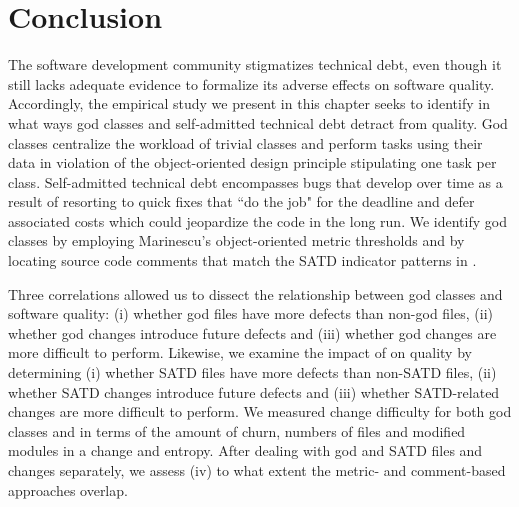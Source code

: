 {%







\section{Conclusion}
\label{chap4:sec:conclusion}


The software development community stigmatizes technical debt, even though it still lacks adequate evidence to formalize its adverse effects on software quality. Accordingly, the empirical study we present in this chapter seeks to identify in what ways god classes and self-admitted technical debt detract from quality. God classes centralize the workload of trivial classes and perform tasks using their data in violation of the object-oriented design principle stipulating one task per class. Self-admitted technical debt encompasses bugs that develop over time as a result of resorting to quick fixes that ``do the job" for the deadline and defer associated costs which could jeopardize the code in the long run. We identify god classes by employing Marinescu's \cite{marinescu2004detection} object-oriented metric thresholds and \SATD by locating source code comments that match the SATD indicator patterns in \cite{ICSM_PotdarS14}.


Three correlations allowed us to dissect the relationship between god classes and software quality: (i) whether god files have more defects than non-god files, (ii) whether god changes introduce future defects and (iii) whether god changes are more difficult to perform. Likewise, we examine the impact of \SATD on quality by determining (i) whether SATD files have more defects than non-SATD files, (ii) whether SATD changes introduce future defects and (iii) whether SATD-related changes are more difficult to perform. We measured change difficulty for both god classes and \SATD in terms of the amount of churn, numbers of files and modified modules in a change and entropy. After dealing with god and SATD files and changes separately, we assess (iv) to what extent the metric- and comment-based approaches overlap.


}
